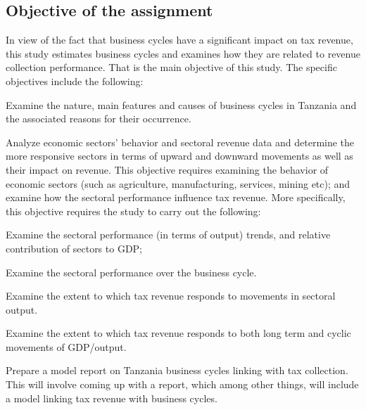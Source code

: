 \documentclass[12pt,a4paper,final]{article}
\begin{document}
\subsection{Objective of the assignment}
In view of the fact that business cycles have a significant impact on tax revenue, this study estimates business cycles and examines how they are related  to revenue collection performance.  That is the main objective of this study.  The specific objectives include the following:

\begin{compactenum}[1)]
\item Examine the nature, main features and causes of business cycles in Tanzania and the associated reasons for their occurrence. 

\item	Analyze economic sectors' behavior and  sectoral revenue data and determine the more responsive sectors in terms of upward and downward movements as well as their impact on revenue. This objective requires examining the behavior of economic sectors (such as agriculture, manufacturing, services, mining etc); and examine how the sectoral performance influence tax revenue.  More specifically, this objective requires the study to carry out the following:

\begin{compactenum}[(i)]
\item	Examine the sectoral performance (in terms of output) trends, and relative contribution of sectors to GDP;

\item	Examine the sectoral performance over the business cycle.   

\item Examine the extent to which tax revenue responds to movements in sectoral output. 

\end{compactenum}

\item 	Examine the extent to which tax revenue responds to both long term and cyclic movements of GDP/output. 

\item Prepare a model report on Tanzania business cycles linking with tax collection.  This will involve coming up with a report, which among other things, will include a model linking tax revenue with business cycles.
 
\end{compactenum}
\end{document}
